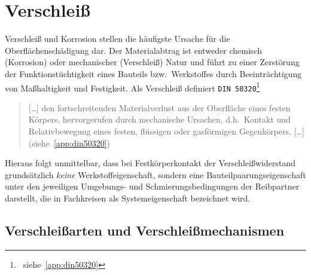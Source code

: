 \documentclass[12pt,a4paper,bibliography=totocnumbered,listof=totocnumbered,fleqn]{scrartcl}
\begin{document}
\section{Verschleiß}
\label{cha:verkor}

Verschleiß und Korrosion stellen die häufigste Ursache für die Oberflächenschädigung dar.
Der Materialabtrag ist entweder chemisch (Korrosion) oder mechanischer (Verschleiß) Natur und führt zu einer Zerstörung der Funktionstüchtigkeit eines Bauteils bzw.\ Werkstoffes durch Beeinträchtigung von Maßhaltigkeit und Festigkeit. Als Verschleiß definiert \texttt{DIN 50320}\footnote{~siehe~\ref{app:din50320}}

\begin{quote}
[\ldots] den fortschreitenden Materialverlust aus der Oberfläche eines festen Körpers, hervorgerufen durch mechanische Ursachen, d.h.\ Kontakt und Relativbewegung eines festen, flüssigen oder gasförmigen Gegenkörpers. [\ldots] (siehe~\ref{app:din50320})
\end{quote}

Hieraus folgt unmittelbar, dass bei Festkörperkontakt der Verschleißwiderstand grundsätzlich \emph{keine} Werkstoffeigenschaft, sondern eine Bauteilpaarungseigenschaft unter den jeweiligen Umgebungs- und Schmierungsbedingungen der Reibpartner darstellt, die in Fachkreisen als Systemeigenschaft bezeichnet wird.

\subsection{Verschleißarten und Verschleißmechanismen}
\label{sec:verver}
\end{document}
